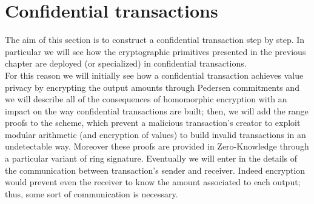 \chapter{Confidential transactions}
\label{chpr:CTs}
The aim of this section is to construct a confidential transaction step by step. In particular we will see how the cryptographic primitives presented in the previous chapter are deployed (or specialized) in confidential transactions.\\
For this reason we will initially see how a confidential transaction achieves value privacy by encrypting the output amounts through Pedersen commitments and we will describe all of the consequences of homomorphic encryption with an impact on the way confidential transactions are built; then, we will add the range proofs to the scheme, which prevent a malicious transaction's creator to exploit modular arithmetic (and encryption of values) to build invalid transactions in an undetectable way. Moreover these proofs are provided in Zero-Knowledge through a particular variant of ring signature. Eventually we will enter in the details of the communication between transaction's sender and receiver. Indeed encryption would prevent even the receiver to know the amount associated to each output; thus, some sort of communication is necessary.


